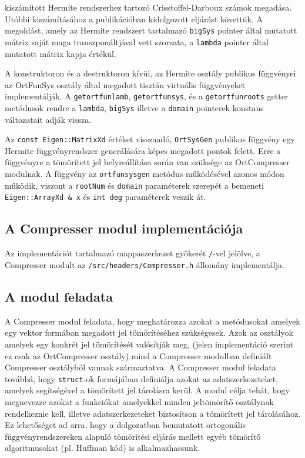 \documentclass[oneside,titlepage,12pt,a4paper]{report}
\begin{document}
kiszámított Hermite rendszerhez tartozó Crisstoffel-Darboux számok megadása. Utóbbi kiszámításához a \cite{} publikációban kidolgozott eljárást követtük. A megoldást, amely az Hermite rendszert tartalmazó \texttt{bigSys} pointer által mutatott mátrix saját maga transzponáltjával vett szorzata, a \texttt{lambda} pointer által mutatott mátrix kapja értékül. 
\par A konstruktoron és a destruktoron kívül, az Hermite osztály publikus függvényei az OrtFunSys osztály által megadott tisztán virtuális függvényeket implementálják. A \texttt{getortfunlamb}, \texttt{getortfunsys}, és a \texttt{getortfunroots} getter metódusok rendre a \texttt{lambda}, \texttt{bigSys} illetve a \texttt{domain} pointerek konstans változatait adják vissza. 
\par Az \texttt{const Eigen::MatrixXd} értéket visszaadó, \texttt{OrtSysGen} publikus függvény egy Hermite függvényrendszer generálására képes megadott pontok felett. Erre a függvényre a tömörített jel helyreállítása során van szüksége az OrtCompresser modulnak. A függvény az \texttt{ortfunsysgen} metódus működésével azonos módon működik, viszont a \texttt{rootNum} és \texttt{domain} paraméterek szerepét a bemeneti \texttt{Eigen::ArrayXd \& x} és \texttt{int deg} paraméterek veszik át.   

\subsection{A Compresser modul implementációja} \label{subsec::compr}

Az implementációt tartalmazó mappaszerkezet gyökerét \texttt{/}-vel jelölve, a Compresser modult  az \texttt{/src/headers/Compresser.h} állomány implementálja.

\subsection*{A modul feladata}

\par A Compresser modul feladata, hogy meghatározza azokat a metódusokat amelyek egy vektor formában megadott jel tömörítéséhez szükségesek. Azok az osztályok amelyek egy konkrét jel tömörítését valósítják meg, (jelen implementáció szerint ez csak az OrtCompresser osztály) mind a Compresser modulban definiált Compresser osztályból vannak származtatva. A Compresser modul feladata továbbá, hogy \texttt{struct}-ok formájában definiálja azokat az adatszerkezeteket, amelyek segítségével a tömörített jel tárolásra kerül. A modul célja tehát, hogy megnevezze azokat a funkciókat amelyekkel minden jeltömörítő osztálynak rendelkeznie kell, illetve adatszerkezeteket biztosítson a tömörített jel tárolásához. Ez lehetőséget ad arra, hogy a dolgozatban bemutatott ortogonális függvényrendszereken alapuló tömörítési eljárás mellett egyéb tömörítő algoritmusokat (pl. Huffman kód) is alkalmazhassunk.  
\end{document}
